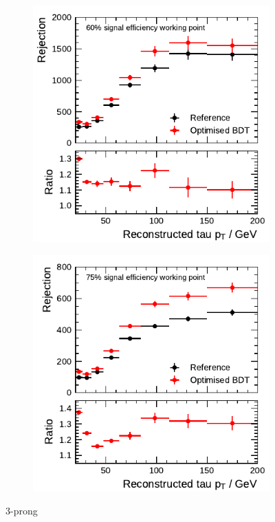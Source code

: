 \begin{figure}[htb]
  \centering
  \begin{subfigure}{0.48\textwidth}
    \centering
    \includegraphics{./figures/bdt_perf/post_optimisation/rejection_medium_3p.pdf}
  \end{subfigure}\hfill
  \begin{subfigure}{0.48\textwidth}
    \centering
    \includegraphics{./figures/bdt_perf/post_optimisation/rejection_loose_3p.pdf}
  \end{subfigure}
  \caption{3-prong}
\end{figure}


